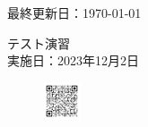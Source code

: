 \documentclass[a4paper,11pt]{jsarticle}
\begin{document}
\begin{titlepage}
  \hfill {最終更新日：\today}
  \begin{center}
    {\Huge\gt テスト演習}\\ \vspace{\baselineskip}
    \textup{\large 実施日：2023年12月2日}\\ 
  \end{center}
  \vfill
  \begin{figure}[H]
    \includegraphics[width=0.1\textwidth]{../graphs/qrcode.png}
  \end{figure}
\end{titlepage}

\qPart

\calcPage

\qPart



\qPart

\calcPage





\brankPage
\end{document}
